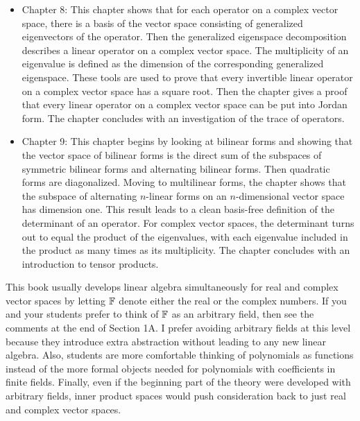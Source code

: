 \begin{itemize}
  one of the highlights of this book. The work in earlier chapters pays off
  here with especially simple proofs. This chapter also deals with positive
  operators, isometries, unitary operators, matrix factorizations, and
  especially the singular value decomposition, which leads to the polar
  decomposition and norms of linear maps.
\item Chapter 8: This chapter shows that for each operator on a complex vector
  space, there is a basis of the vector space consisting of generalized
  eigenvectors of the operator. Then the generalized eigenspace decomposition
  describes a linear operator on a complex vector space. The multiplicity of an
  eigenvalue is defined as the dimension of the corresponding generalized
  eigenspace. These tools are used to prove that every invertible linear
  operator on a complex vector space has a square root. Then the chapter gives
  a proof that every linear operator on a complex vector space can be put into
  Jordan form. The chapter concludes with an investigation of the trace of
  operators.
\item Chapter 9: This chapter begins by looking at bilinear forms and showing
  that the vector space of bilinear forms is the direct sum of the subspaces of
  symmetric bilinear forms and alternating bilinear forms. Then quadratic forms
  are diagonalized. Moving to multilinear forms, the chapter shows that the
  subspace of alternating $n$-linear forms on an $n$-dimensional vector space
  has dimension one. This result leads to a clean basis-free definition of the
  determinant of an operator. For complex vector spaces, the determinant turns
  out to equal the product of the eigenvalues, with each eigenvalue included in
  the product as many times as its multiplicity. The chapter concludes with an
  introduction to tensor products.
\end{itemize}

This book usually develops linear algebra simultaneously for real and complex
vector spaces by letting $\mathbb{F}$ denote either the real or the complex numbers. If
you and your students prefer to think of $\mathbb{F}$ as an arbitrary field, then see
the comments at the end of Section 1A. I prefer avoiding arbitrary fields at
this level because they introduce extra abstraction without leading to any new
linear algebra. Also, students are more comfortable thinking of polynomials as
functions instead of the more formal objects needed for polynomials with
coefficients in finite fields. Finally, even if the beginning part of the
theory were developed with arbitrary fields, inner product spaces would push
consideration back to just real and complex vector spaces.

